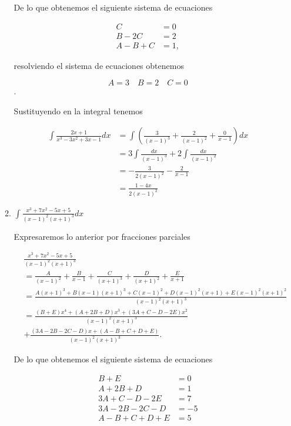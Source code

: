 \documentclass[letterpaper]{article}
\theoremstyle{definition}
\theoremstyle{definition}
\begin{document}
\begin{enumerate}
\begin{enumerate}
    De lo que obtenemos el siguiente sistema de ecuaciones

    \begin{align*}
      C &= 0\\
      B - 2C &= 2\\
      A - B + C &= 1,
    \end{align*}

    resolviendo el sistema de ecuaciones obtenemos

    \[A = 3 \quad B = 2 \quad C = 0\].

    Sustituyendo en la integral tenemos

    \begin{align*}
      \int \frac{2x+1}{x^3-3x^2+3x-1}dx &= \int \left(\frac{3}{(x-1)^3}+ \frac{2}{(x-1)^2} + \frac{0}{x-1}\right)dx\\
      &= 3\int \frac{dx}{(x-1)^3} + 2\int \frac{dx}{(x-1)^2}\\
      &= -\frac{3}{2(x-1)^2} - \frac{2}{x-1}\\
      &= \frac{1-4x}{2(x-1)^2}
    \end{align*}
    
    \item $\int \frac{x^3+7x^2-5x+5}{(x-1)^2(x+1)^3}dx$
    
    Expresaremos lo anterior por fracciones parciales

    \begin{align*}
      &\frac{x^3+7x^2-5x+5}{(x-1)^2(x+1)^3}\\
      &= \frac{A}{(x-1)^2}+ \frac{B}{x-1} + \frac{C}{(x+1)^3} + \frac{D}{(x+1)^2} + \frac{E}{x+1}\\
      &= \frac{A(x+1)^3 + B(x-1)(x+1)^3 + C(x-1)^2 + D(x-1)^2(x+1) + E(x-1)^2(x+1)^2}{(x-1)^2(x+1)^3}\\
      &= \frac{ (B+E)x^4 + (A+2B+D)x^3 + (3A+C-D-2E)x^2}{(x-1)^2(x+1)^3}\\
      &+ \frac{(3A-2B-2C-D)x + (A-B+C+D+E) }{(x-1)^2(x+1)^3}.
    \end{align*}

    De lo que obtenemos el siguiente sistema de ecuaciones

    \begin{align*}
      B+E&=0\\
      A+2B+D&=1\\
      3A+C-D-2E&=7\\
      3A-2B-2C-D&=-5\\
      A-B+C+D+E&=5\\
    \end{align*}


\end{enumerate}
\end{enumerate}
\end{document}
